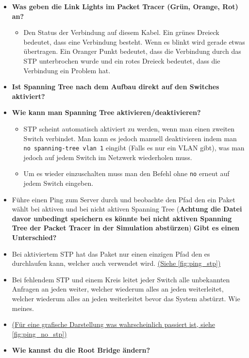 \documentclass{article}
\begin{document}
	\begin{itemize}
		\item{\textbf{Was geben die Link Lights im Packet Tracer (Grün, Orange, Rot) an?}}
		\begin{itemize}
			\item{Den Status der Verbindung auf diesem Kabel. Ein grünes Dreieck bedeutet, dass eine Verbindung besteht. Wenn es blinkt wird gerade etwas übertragen. Ein Oranger Punkt bedeutet, dass die Verbindung durch das STP unterbrochen wurde und ein rotes Dreieck bedeutet, dass die Verbindung ein Problem hat.}
		\end{itemize}
		\item{\textbf{Ist Spanning Tree nach dem Aufbau direkt auf den Switches aktiviert?}}
		\item{\textbf{Wie kann man Spanning Tree aktivieren/deaktivieren?}}
		\begin{itemize}
			\item{STP scheint automatisch aktiviert zu werden, wenn man einen zweiten Switch verbindet. Man kann es jedoch manuell deaktivieren indem man \texttt{no spanning-tree vlan 1} eingibt (Falls es nur ein VLAN gibt), was man jedoch auf jedem Switch im Netzwerk wiederholen muss.}
			\item{Um es wieder einzuschalten muss man den Befehl ohne \texttt{no} erneut auf jedem Switch eingeben.}
		\end{itemize}
		\item{Führe einen Ping zum Server durch und beobachte den Pfad den ein Paket wählt bei aktiven und bei nicht aktiven Spanning Tree (\textbf{Achtung die Datei davor unbedingt speichern es könnte bei nicht aktiven Spanning Tree der Packet Tracer in der Simulation abstürzen}) \textbf{Gibt es einen Unterschied?}}
		\item{Bei aktiviertem STP hat das Paket nur einen einzigen Pfad den es durchlaufen kann, welcher auch verwendet wird. \hyperref[fig:ping_stp]{(Siehe \ref{fig:ping_stp})}}
		\item{Bei fehlendem STP und einem Kreis leitet jeder Switch alle unbekannten Anfragen an jeden weiter, welcher wiederum alles an jeden weiterleitet, welcher wiederum alles an jeden weiterleitet bevor das System abstürzt. Wie meines.}
		\item[]{\hyperref[fig:ping_no_stp]{(Für eine grafische Darstellung was wahrscheinlich passiert ist, siehe \ref{fig:ping_no_stp})}}
		\item{\textbf{Wie kannst du die Root Bridge ändern?}}
		\begin{itemize}

\end{itemize}
\end{itemize}
\end{document}
